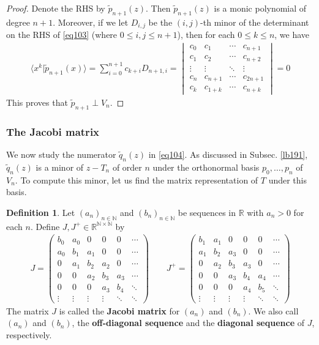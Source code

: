 \documentclass[12pt,b5paper,notitlepage]{article}
\theoremstyle{definition}
\newtheorem{df}{Definition}[subsection]
\theoremstyle{plain}
\newcommand{\wtd}{\widetilde}
\newcommand{\bk}[1]{\langle {#1}\rangle}
\newcommand{\Nbb}{\mathbb N}
\newcommand{\Rbb}{\mathbb R}
\numberwithin{equation}{section}
\begin{document}
\begin{proof}
Denote the RHS by $\wtd p_{n+1}(z)$. Then $\wtd p_{n+1}(z)$ is a monic polynomial of degree $n+1$. Moreover, if we let $D_{i,j}$ be the $(i,j)$-th minor of the determinant on the RHS of \eqref{eq103} (where $0\leq i,j\leq n+1$), then for each $0\leq k\leq n$, we have
\begin{align*}
\bk{x^k|\wtd p_{n+1}(x)}=\sum_{i=0}^{n+1}c_{k+i}D_{n+1,i}=\begin{vmatrix}
c_0&c_1&\cdots&c_{n+1}\\
c_1&c_2&\cdots&c_{n+2}\\
\vdots&\vdots&\ddots&\vdots\\
c_n&c_{n+1}&\cdots&c_{2n+1}\\
c_k&c_{1+k}&\cdots& c_{n+k}
\end{vmatrix}=0
\end{align*}
This proves that $\wtd p_{n+1}\perp V_n$.
\end{proof}





\subsubsection{The Jacobi matrix}






We now study the numerator $\wtd q_n(z)$ in \eqref{eq104}. As discussed in Subsec. \ref{lb191}, $\wtd q_n(z)$ is a minor of $z-T_n$ of order $n$ under the orthonormal basis $p_0,\dots,p_n$ of $V_n$. To compute this minor, let us find the matrix representation of $T$ under this basis.


\begin{df}\label{lb193}
Let $(a_n)_{n\in\Nbb}$ and $(b_n)_{n\in\Nbb}$ be sequences in $\Rbb$ with $a_n>0$ for each $n$. Define $J,J^+\in\Rbb^{\Nbb\times\Nbb}$ by
\begin{align*}
J=\begin{pmatrix}
b_0&a_0&0&0&0&\cdots\\
a_0&b_1&a_1&0&0&\cdots\\
0&a_1&b_2&a_2&0&\cdots\\
0&0&a_2&b_3&a_3&\cdots\\
0&0&0&a_3&b_4&\ddots\\
\vdots&\vdots&\vdots&\vdots&\ddots&\ddots
\end{pmatrix}
\qquad
J^+=\begin{pmatrix}
b_1&a_1&0&0&0&\cdots\\
a_1&b_2&a_3&0&0&\cdots\\
0&a_2&b_3&a_3&0&\cdots\\
0&0&a_3&b_4&a_4&\cdots\\
0&0&0&a_4&b_5&\ddots\\
\vdots&\vdots&\vdots&\vdots&\ddots&\ddots
\end{pmatrix}
\end{align*}
The matrix $J$ is called the \textbf{Jacobi matrix}  for $(a_n)$ and $(b_n)$. We also call $(a_n)$ and $(b_n)$, the \textbf{off-diagonal sequence} and the \textbf{diagonal sequence} of $J$, respectively. 
\end{df}
\end{document}
